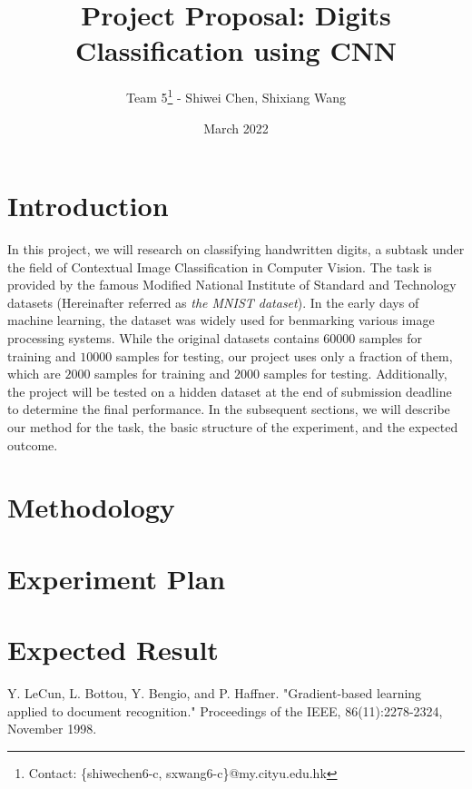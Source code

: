 \documentclass{article}
\title{Project Proposal: Digits Classification using CNN}
\author{Team 5\footnote{Contact: \{shiwechen6-c, sxwang6-c\}@my.cityu.edu.hk}  \:- Shiwei Chen, Shixiang Wang}
\date{March 2022}
\begin{document}
\maketitle

\section{Introduction}
In this project, we will research on classifying handwritten digits, a subtask under the field of Contextual Image Classification in Computer Vision. The task is provided by the famous Modified National Institute of Standard and Technology datasets \cite{ref1} (Hereinafter referred as \textit{the MNIST dataset}). In the early days of machine learning, the dataset was widely used for benmarking various image processing systems. While the original datasets contains $60000$ samples for training and $10000$ samples for testing, our project uses only a fraction of them, which are $2000$ samples for training and $2000$ samples for testing. Additionally, the project will be tested on a hidden dataset at the end of submission deadline to determine the final performance. In the subsequent sections, we will describe our method for the task, the basic structure of the experiment, and the expected outcome.

\section{Methodology}
\section{Experiment Plan}
\section{Expected Result}

\begin{thebibliography}{00}
 Y. LeCun, L. Bottou, Y. Bengio, and P. Haffner. "Gradient-based learning applied to document recognition." Proceedings of the IEEE, 86(11):2278-2324, November 1998.
\end{thebibliography}
\end{document}
